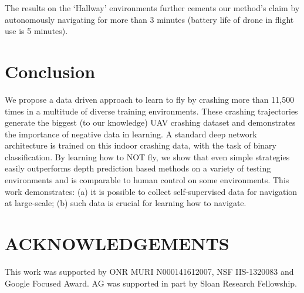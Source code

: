 \documentclass[letterpaper, 10 pt, conference]{ieeeconf}  %
\begin{document}
The results on the `Hallway' environments further cements our method's claim by autonomously navigating for more than 3 minutes (battery life of drone in flight use is 5 minutes).  


\section{Conclusion}
We propose a data driven approach to learn to fly by crashing more than 11,500 times in a multitude of diverse training environments. These crashing trajectories generate the biggest (to our knowledge) UAV crashing dataset and demonstrates the importance of negative data in learning. A standard deep network architecture is trained on this indoor crashing data, with the task of binary classification. By learning how to NOT fly, we show that even simple strategies easily outperforms depth prediction based methods on a variety of testing environments and is comparable to human control on some environments. This work demonstrates: (a) it is possible to collect self-supervised data for navigation at large-scale; (b) such data is crucial for learning how to navigate.


\section*{ACKNOWLEDGEMENTS}
This work was supported by ONR MURI N000141612007, NSF IIS-1320083 and Google Focused Award. AG was supported in part by Sloan Research Fellowship.



\end{document}
